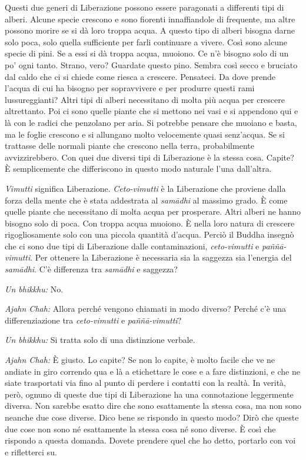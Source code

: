 Questi due generi di Liberazione possono essere paragonati a differenti
tipi di alberi. Alcune specie crescono e sono fiorenti innaffiandole di
frequente, ma altre possono morire se si dà loro troppa acqua. A questo
tipo di alberi bisogna darne solo poca, solo quella sufficiente per
farli continuare a vivere. Così sono alcune specie di pini. Se a essi si
dà troppa acqua, muoiono. Ce n'è bisogno solo di un po' ogni tanto.
Strano, vero? Guardate questo pino. Sembra così secco e bruciato dal
caldo che ci si chiede come riesca a crescere. Pensateci. Da dove prende
l'acqua di cui ha bisogno per sopravvivere e per produrre questi rami
lussureggianti? Altri tipi di alberi necessitano di molta più acqua per
crescere altrettanto. Poi ci sono quelle piante che si mettono nei vasi
e si appendono qui e là con le radici che penzolano per aria. Si
potrebbe pensare che muoiano e basta, ma le foglie crescono e si
allungano molto velocemente quasi senz'acqua. Se si trattasse delle
normali piante che crescono nella terra, probabilmente avvizzirebbero.
Con quei due diversi tipi di Liberazione è la stessa cosa. Capite? È
semplicemente che differiscono in questo modo naturale l'una dall'altra.

\emph{Vimutti} significa Liberazione. \emph{Ceto-vimutti} è la
Liberazione che proviene dalla forza della mente che è stata addestrata
al \emph{samādhi} al massimo grado. È come quelle piante che necessitano
di molta acqua per prosperare. Altri alberi ne hanno bisogno solo di
poca. Con troppa acqua muoiono. È nella loro natura di crescere
rigogliosamente solo con una piccola quantità d'acqua. Perciò il Buddha
insegnò che ci sono due tipi di Liberazione dalle contaminazioni,
\emph{ceto-vimutti} e \emph{paññā-vimutti}. Per ottenere la Liberazione
è necessaria sia la saggezza sia l'energia del \emph{samādhi}. C'è
differenza tra \emph{samādhi} e saggezza?

\emph{Un bhikkhu:} No.

\emph{Ajahn Chah:} Allora perché vengono chiamati in modo diverso? Perché c'è
una differenziazione tra \emph{ceto-vimutti} e \emph{paññā-vimutti}?

\emph{Un bhikkhu:} Si tratta solo di una distinzione verbale.

\emph{Ajahn Chah:} È giusto. Lo capite? Se non lo capite, è molto facile che ve
ne andiate in giro correndo qua e là a etichettare le cose e a fare
distinzioni, e che ne siate trasportati via fino al punto di perdere i
contatti con la realtà. In verità, però, ognuno di queste due tipi di
Liberazione ha una connotazione leggermente diversa. Non sarebbe esatto
dire che sono esattamente la stessa cosa, ma non sono neanche due cose
diverse. Dico bene se rispondo in questo modo? Dirò che queste due cose
non sono né esattamente la stessa cosa né sono diverse. È così che
rispondo a questa domanda. Dovete prendere quel che ho detto, portarlo
con voi e rifletterci su.

